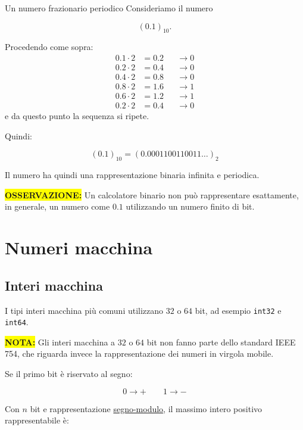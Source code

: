 \documentclass{article}
\begin{document}
\begin{ex}{Un numero frazionario periodico}{}
    Consideriamo il numero

    $$
        (0.1)_{10}.
    $$

    Procedendo come sopra:
    \begin{align*}
        0.1\cdot2 & =0.2 &  & \longrightarrow 0 \\
        0.2\cdot2 & =0.4 &  & \longrightarrow 0 \\
        0.4\cdot2 & =0.8 &  & \longrightarrow 0 \\
        0.8\cdot2 & =1.6 &  & \longrightarrow 1 \\
        0.6\cdot2 & =1.2 &  & \longrightarrow 1 \\
        0.2\cdot2 & =0.4 &  & \longrightarrow 0
    \end{align*}
    e da questo punto la sequenza si ripete.

    Quindi:

    $$
        \boxed{
            (0.1)_{10}
            =
            (0.0001100110011\ldots)_2
        }
    $$

    Il numero ha quindi una rappresentazione binaria infinita e periodica.

    \colorbox{yellow}{\textbf{OSSERVAZIONE:}}
    Un calcolatore binario non può rappresentare esattamente, in generale, un numero come $0.1$ utilizzando un numero finito di bit.
\end{ex}

\section{Numeri macchina}

\subsection{Interi macchina}

I tipi interi macchina più comuni utilizzano $32$ o $64$ bit, ad esempio \texttt{int32} e \texttt{int64}.

\colorbox{yellow}{\textbf{NOTA:}}
Gli interi macchina a $32$ o $64$ bit non fanno parte dello standard IEEE 754, che riguarda invece la rappresentazione dei numeri in virgola mobile.

Se il primo bit è riservato al segno:

$$
    0\longrightarrow +
    \qquad
    1\longrightarrow -
$$

Con $n$ bit e rappresentazione \underline{segno-modulo}, il massimo intero positivo rappresentabile è:
\end{document}
